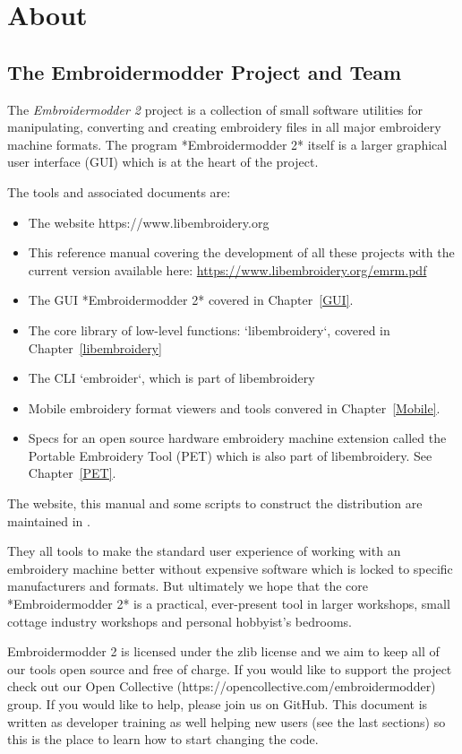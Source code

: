 \documentclass[11pt]{report}
\begin{document}
\section{About}

\subsection{The Embroidermodder Project and Team}

The \emph{Embroidermodder 2} project is a collection of small software
utilities for manipulating, converting and creating embroidery files in all
major embroidery machine formats. The program *Embroidermodder 2* itself
is a larger graphical user interface (GUI) which is at the heart of the project.

The tools and associated documents are:

\begin{itemize}
\item The website https://www.libembroidery.org
\item This reference manual covering the development of all these projects with the current version available here: \url{https://www.libembroidery.org/emrm.pdf}
\item The GUI *Embroidermodder 2* covered in Chapter~\ref{GUI}.
\item The core library of low-level functions: `libembroidery`, covered in Chapter~\ref{libembroidery}
\item The CLI `embroider`, which is part of libembroidery
\item Mobile embroidery format viewers and tools convered in Chapter~\ref{Mobile}.
\item Specs for an open source hardware embroidery machine extension called the Portable Embroidery Tool (PET) which is also part of libembroidery. See Chapter~\ref{PET}.
\end{itemize}

The website, this manual and some scripts to construct the distribution are
maintained in \citep{thewebsite}.

They all tools to make the standard
user experience of working with an embroidery machine better without expensive
software which is locked to specific manufacturers and formats. But ultimately
we hope that the core *Embroidermodder 2* is a practical, ever-present tool in
larger workshops, small cottage industry workshops and personal hobbyist's
bedrooms.

Embroidermodder 2 is licensed under the zlib license and we aim to keep all of our tools open
source and free of charge. If you would like to support the project check out our  Open
Collective (https://opencollective.com/embroidermodder) group.
If you would like to help,
please join us on GitHub. This document is written as developer training as well helping new
users (see the last sections) so this is the place to learn how to start changing the code.
\end{document}
